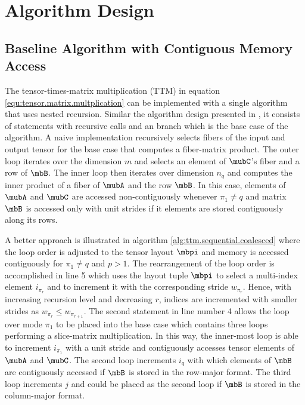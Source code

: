 \section{Algorithm Design}
\label{sec:design}
\subsection{Baseline Algorithm with Contiguous Memory Access}
\label{sec:design:modified.baseline.algorithm}
The tensor-times-matrix multiplication (TTM) in equation \ref{equ:tensor.matrix.multplication} can be implemented with a single algorithm that uses nested recursion.
Similar the algorithm design presented in \cite{bassoy:2018:fast}, it consists of  statements with recursive calls and an  branch which is the base case of the algorithm.
A naive implementation recursively selects fibers of the input and output tensor for the base case that computes a fiber-matrix product.
The outer loop iterates over the dimension $m$ and selects an element of $\mubC$'s fiber and a row of $\mbB$. 
The inner loop then iterates over dimension $n_q$ and computes the inner product of a fiber of $\mubA$ and the row $\mbB$. 
In this case, elements of $\mubA$ and $\mubC$ are accessed non-contiguously whenever $\pi_1 \neq q$ and matrix $\mbB$ is accessed only with unit strides 
if it elements are stored contiguously along its rows.

A better approach is illustrated in algorithm \ref{alg:ttm.sequential.coalesced} where the loop order is adjusted to the tensor layout $\mbpi$ and memory is accessed contiguously for $\pi_1 \neq q$ and $p > 1$.
The rearrangement of the loop order is accomplished in line 5 which uses the layout tuple $\mbpi$ to select a multi-index element $i_{\pi_r}$ and to increment it with the corresponding stride $w_{\pi_r}$.
Hence, with increasing recursion level and decreasing $r$, indices are incremented with smaller strides as $w_{\pi_r} \leq w_{\pi_{r+1}}$.
The second  statement in line number 4 allows the loop over mode $\pi_1$ to be placed into the base case which contains three loops performing a slice-matrix multiplication.
In this way, the inner-most loop is able to increment $i_{\pi_1}$ with a unit stride and contiguously accesses tensor elements of $\mubA$ and $\mubC$.
The second loop increments $i_q$ with which elements of $\mbB$ are contiguously accessed if $\mbB$ is stored in the row-major format.
The third loop increments $j$ and could be placed as the second loop if $\mbB$ is stored in the column-major format.

